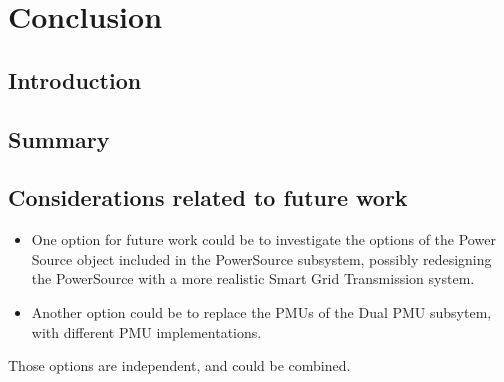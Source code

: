 \chapter{Conclusion}


\section{Introduction}


\section{Summary}




\section{Considerations related to future work}
\begin{itemize}
    \item One option for future work could be to investigate the options of the Power Source object included in the PowerSource subsystem, possibly redesigning the PowerSource with a more realistic Smart Grid Transmission system.
\item Another option could be to replace the PMUs of the Dual PMU subsytem, with different PMU implementations.
\end{itemize}


Those options are independent, and could be combined.

